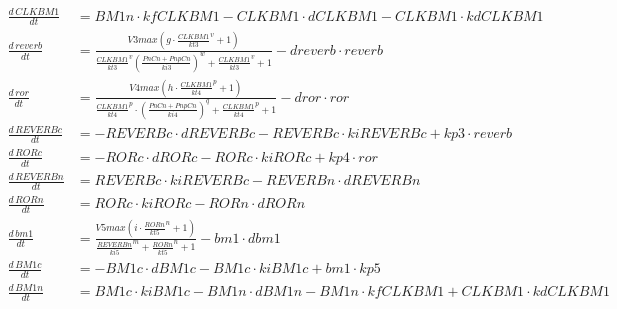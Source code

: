 \begin{model}[p]
  \centering
  \label{mod:relogioeqs}
  \fontsize{9}{11}

  \begin{align*}
    \frac{d\,\mathit{CLKBM1}}{dt} &= \mathit{BM1n} \cdot \mathit{kfCLKBM1} - \mathit{CLKBM1} \cdot \mathit{dCLKBM1} - \mathit{CLKBM1} \cdot \mathit{kdCLKBM1}\\
    \frac{d\,\mathit{reverb}}{dt} &= \frac{\mathit{V3max} \left(\mathit{g} \cdot
    {\frac{\mathit{CLKBM1}}{\mathit{kt3}}}^{\mathit{v}} +
  1\right)}{{\frac{\mathit{CLKBM1}}{\mathit{kt3}}}^{\mathit{v}}
  {\left(\frac{\mathit{PnCn} + \mathit{PnpCn}}{\mathit{ki3}}\right)}^{\mathit{w}} +
  {\frac{\mathit{CLKBM1}}{\mathit{kt3}}}^{\mathit{v}} + 1} - \mathit{dreverb}
  \cdot \mathit{reverb}\\
  \frac{d\,\mathit{ror}}{dt} &= \frac{\mathit{V4max} \left(\mathit{h} \cdot {\frac{\mathit{CLKBM1}}{\mathit{kt4}}}^{\mathit{p}} + 1\right)}{{\frac{\mathit{CLKBM1}}{\mathit{kt4}}}^{\mathit{p}} \cdot {(\frac{\mathit{PnCn} + \mathit{PnpCn}}{\mathit{ki4}})}^{\mathit{q}} + {\frac{\mathit{CLKBM1}}{\mathit{kt4}}}^{\mathit{p}} + 1} - \mathit{dror} \cdot \mathit{ror}\\
  \frac{d\,\mathit{REVERBc}}{dt} &= - \mathit{REVERBc} \cdot \mathit{dREVERBc} - \mathit{REVERBc} \cdot \mathit{kiREVERBc} + \mathit{kp3} \cdot \mathit{reverb}\\
  \frac{d\,\mathit{RORc}}{dt} &= - \mathit{RORc} \cdot \mathit{dRORc} - \mathit{RORc} \cdot \mathit{kiRORc} + \mathit{kp4} \cdot \mathit{ror}\\
  \frac{d\,\mathit{REVERBn}}{dt} &= \mathit{REVERBc} \cdot \mathit{kiREVERBc} - \mathit{REVERBn} \cdot \mathit{dREVERBn}\\
  \frac{d\,\mathit{RORn}}{dt} &= \mathit{RORc} \cdot \mathit{kiRORc} - \mathit{RORn} \cdot \mathit{dRORn}\\
  \frac{d\,\mathit{bm1}}{dt} &= \frac{\mathit{V5max} \left(\mathit{i} \cdot {\frac{\mathit{RORn}}{\mathit{kt5}}}^{\mathit{n}} + 1\right)}{{\frac{\mathit{REVERBn}}{\mathit{ki5}}}^{\mathit{m}} + {\frac{\mathit{RORn}}{\mathit{kt5}}}^{\mathit{n}} + 1} - \mathit{bm1} \cdot \mathit{dbm1}\\
  \frac{d\,\mathit{BM1c}}{dt} &= - \mathit{BM1c} \cdot \mathit{dBM1c} - \mathit{BM1c} \cdot \mathit{kiBM1c} + \mathit{bm1} \cdot \mathit{kp5}\\
  \frac{d\,\mathit{BM1n}}{dt} &= \mathit{BM1c} \cdot \mathit{kiBM1c} - \mathit{BM1n} \cdot \mathit{dBM1n} - \mathit{BM1n} \cdot \mathit{kfCLKBM1} + \mathit{CLKBM1} \cdot \mathit{kdCLKBM1}\\

\end{align*}
\end{model}
